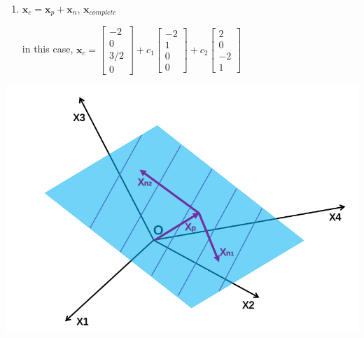 \documentclass[12pt, a4paper]{article}
\begin{document}
{\begin{enumerate}
	\begin{math}
		{\mathbf{x}}_n = 
		c_1
		\begin{bmatrix}
			-2 \\
			1 \\
			0 \\
			0 
		\end{bmatrix}
		 + 
		c_2
		\begin{bmatrix}
			2 \\
			0 \\
			-2 \\
			1 
		\end{bmatrix}
	\end{math}
	\item ${\mathbf{x}}_{c}={\mathbf{x}}_{p}+{\mathbf{x}}_{n}$, ${\mathbf{x}}_{complete}$
	\par in this case, 
	\begin{math}
		{\mathbf{x}}_c = 
		\begin{bmatrix}
			-2 \\
			0 \\
			3/2 \\
			0 
		\end{bmatrix}
		 + 
		c_1
		\begin{bmatrix}
			-2 \\
			1 \\
			0 \\
			0 
		\end{bmatrix}
		+ 
		c_2
		\begin{bmatrix}
			2 \\
			0 \\
			-2 \\
			1 
		\end{bmatrix}
	\end{math}
\end{enumerate}
\begin{center}
	\includegraphics[scale=0.8]{figures/S8-1.png}

\end{center}}
\end{document}
